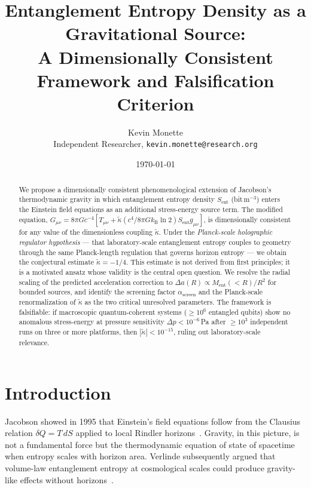 \documentclass[12pt,twocolumn]{article}
\newcommand{\kB}{k_{\mathrm{B}}}
\newcommand{\kt}{\tilde{\kappa}}
\newcommand{\Sent}{S_{\mathrm{ent}}}
\newcommand{\Ment}{M_{\mathrm{ent}}}
\newcommand{\asc}{\alpha_{\mathrm{screen}}}
\begin{document}
\title{Entanglement Entropy Density as a Gravitational Source:\\
A Dimensionally Consistent Framework and Falsification Criterion}

\author{Kevin Monette \\ \small Independent Researcher, \texttt{kevin.monette@research.org}}

\date{\today}

\begin{abstract}
We propose a dimensionally consistent phenomenological extension of Jacobson's thermodynamic
gravity in which entanglement entropy density $\Sent$ (bit\,m$^{-3}$) enters the Einstein
field equations as an additional stress-energy source term.  The modified equation,
$G_{\mu\nu} = 8\pi G c^{-4}[T_{\mu\nu} + \kt(c^4/8\pi G\kB\ln2)\Sent g_{\mu\nu}]$,
is dimensionally consistent for any value of the dimensionless coupling $\kt$.  Under the
\emph{Planck-scale holographic regulator hypothesis} --- that laboratory-scale entanglement
entropy couples to geometry through the same Planck-length regulation that governs horizon
entropy --- we obtain the conjectural estimate $\kt = -1/4$.
This estimate is not derived from first principles; it is a motivated ansatz whose validity is
the central open question.
We resolve the radial scaling of the predicted acceleration correction to
$\Delta a(R) \propto \Ment(<\!R)/R^2$ for bounded sources, and identify the screening factor
$\asc$ and the Planck-scale renormalization of $\kt$ as the two critical unresolved parameters.
The framework is falsifiable: if macroscopic quantum-coherent systems ($\geq\!10^6$ entangled
qubits) show no anomalous stress-energy at pressure sensitivity
$\Delta p < 10^{-6}$\,Pa after $\geq\!10^3$ independent runs on three or more platforms,
then $|\kt|<10^{-15}$, ruling out laboratory-scale relevance.
\end{abstract}


\maketitle

\section{Introduction}
\label{sec:intro}

Jacobson showed in 1995 that Einstein's field equations follow from the Clausius relation
$\delta Q = T\,dS$ applied to local Rindler horizons~\cite{Jacobson1995}.  Gravity, in this
picture, is not a fundamental force but the thermodynamic equation of state of spacetime when
entropy scales with horizon area.  Verlinde subsequently argued that volume-law entanglement
entropy at cosmological scales could produce gravity-like effects without horizons~\cite{Verlinde2017}.
\end{document}
